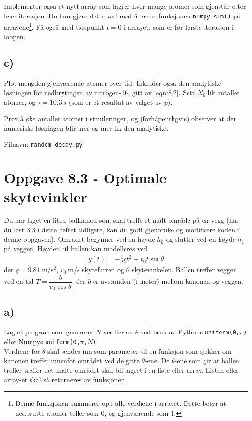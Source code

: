 \documentclass[10pt,a4paper]{article}
\begin{document}
Implementer også et nytt array som lagrer hvor mange atomer som gjenstår etter hver iterasjon. Du kan gjøre dette ved med å bruke funksjonen \texttt{numpy.sum()} på arrayene\footnote{Denne funksjonen summerer opp alle verdiene i arrayet. Dette betyr at nedbrutte atomer teller som 0, og gjenværende som 1.}. Få også med tidspunkt $t=0$ i arrayet, som er før første iterasjon i loopen.
 
\subsection*{c)}
Plot mengden gjenværende atomer over tid. Inkluder også den analytiske løsningen for nedbrytingen av nitrogen-16, gitt av \ref{eqn:8.2}. Sett $N_0$ lik antallet atomer, og $\tau = \SI{10.3}{s}$ (som er et resultat av valget av $p$).
 
Prøv å øke antallet atomer i simuleringen, og (forhåpentligvis) observer at den numeriske løsningen blir mer og mer lik den analytiske.
 
Filnavn: \texttt{random\_decay.py}
 
 
 
 
 
 
\section*{Oppgave 8.3 - Optimale skytevinkler}
Du har laget en liten ballkanon som skal treffe et målt område på en vegg (har du løst 3.3 i dette heftet tidligere, kan du godt gjenbruke og modifisere koden i denne oppgaven). Området begynner ved en høyde $h_0$ og slutter ved en høyde $h_1$ på veggen. 
Høyden til ballen kan modelleres ved
\begin{align*}
y(t) =  -\frac{1}{2}g t^2 + v_0t\sin\theta
\end{align*}
der $g = 9.81\;\mathrm{m/s^2}$, $v_0\:$m/s skytefarten og $\theta$  skytevinkelen. 
Ballen treffer veggen ved en tid $T = \dfrac{b }{v_0\cos\theta}$, der $b$ er avstanden (i meter) mellom kanonen og veggen. 
 
\subsection*{a)}
Lag et program som genererer $N$ verdier av $\theta$ ved bruk av Pythons \texttt{uniform(0,$\pi$)} eller Numpys \texttt{uniform(0,$\pi$,$N$)}.\\
Verdiene for $\theta$ skal sendes inn som parameter til en funksjon som sjekker om kanonen treffer innenfor området ved de gitte $\theta$-ene. De $\theta$-ene som gir at ballen treffer treffer det malte området skal bli lagret i en liste eller array. Listen eller array-et skal så returneres av funksjonen. 
 
\end{document}
